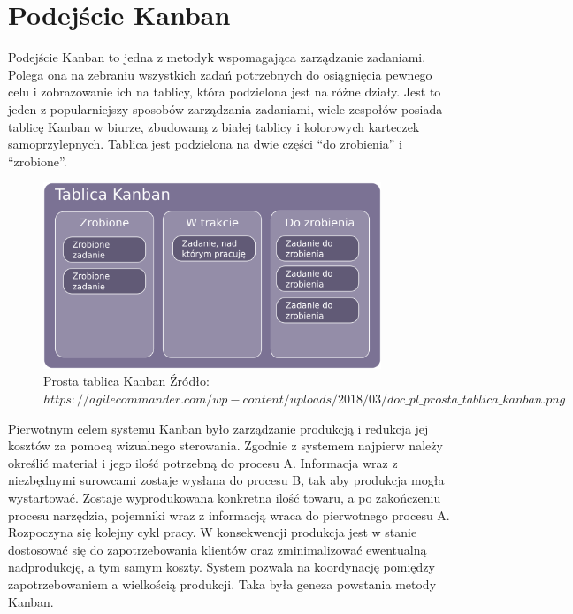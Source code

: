 \section{Podejście Kanban}

\indent 
Podejście Kanban to jedna z metodyk wspomagająca zarządzanie zadaniami. Polega ona na zebraniu wszystkich zadań potrzebnych do osiągnięcia pewnego celu i zobrazowanie ich na tablicy, która podzielona jest na różne działy. Jest to jeden z popularniejszy sposobów zarządzania zadaniami, wiele zespołów posiada tablicę Kanban w biurze, zbudowaną z białej tablicy i kolorowych karteczek samoprzylepnych. Tablica jest podzielona na dwie części “do zrobienia” i “zrobione”.
\begin{figure}[h]
	
	\centering
	\includegraphics[width=0.90\textwidth]{tablica_kanban}		
	 \caption{Prosta tablica Kanban \newline Źródło: $https://agilecommander.com/wp-content/uploads/2018/03/doc\_pl\_prosta\_tablica\_kanban.png $}
\end{figure}


Pierwotnym celem systemu Kanban było zarządzanie produkcją i redukcja jej kosztów za pomocą wizualnego sterowania. Zgodnie z systemem najpierw należy określić materiał i jego ilość potrzebną do procesu A. Informacja wraz z niezbędnymi surowcami zostaje wysłana do procesu B, tak aby produkcja mogła wystartować. Zostaje wyprodukowana konkretna ilość towaru, a po zakończeniu procesu narzędzia, pojemniki wraz z informacją  wraca do pierwotnego procesu A. Rozpoczyna  się kolejny cykl pracy. W konsekwencji produkcja jest w stanie dostosować się do zapotrzebowania klientów oraz zminimalizować ewentualną nadprodukcję, a tym samym koszty. System pozwala na koordynację pomiędzy zapotrzebowaniem a wielkością produkcji. Taka była geneza powstania metody Kanban.

